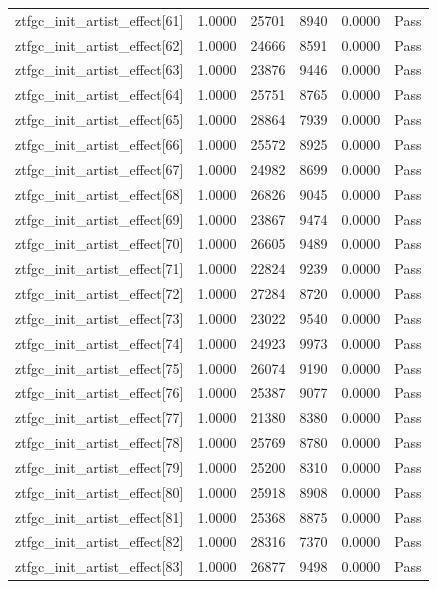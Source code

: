 \begin{table}[htbp]
\begin{tabular}{llrrll}
ztfgc\_init\_artist\_effect[61] & 1.0000 & 25701 & 8940 & 0.0000 & Pass \\
ztfgc\_init\_artist\_effect[62] & 1.0000 & 24666 & 8591 & 0.0000 & Pass \\
ztfgc\_init\_artist\_effect[63] & 1.0000 & 23876 & 9446 & 0.0000 & Pass \\
ztfgc\_init\_artist\_effect[64] & 1.0000 & 25751 & 8765 & 0.0000 & Pass \\
ztfgc\_init\_artist\_effect[65] & 1.0000 & 28864 & 7939 & 0.0000 & Pass \\
ztfgc\_init\_artist\_effect[66] & 1.0000 & 25572 & 8925 & 0.0000 & Pass \\
ztfgc\_init\_artist\_effect[67] & 1.0000 & 24982 & 8699 & 0.0000 & Pass \\
ztfgc\_init\_artist\_effect[68] & 1.0000 & 26826 & 9045 & 0.0000 & Pass \\
ztfgc\_init\_artist\_effect[69] & 1.0000 & 23867 & 9474 & 0.0000 & Pass \\
ztfgc\_init\_artist\_effect[70] & 1.0000 & 26605 & 9489 & 0.0000 & Pass \\
ztfgc\_init\_artist\_effect[71] & 1.0000 & 22824 & 9239 & 0.0000 & Pass \\
ztfgc\_init\_artist\_effect[72] & 1.0000 & 27284 & 8720 & 0.0000 & Pass \\
ztfgc\_init\_artist\_effect[73] & 1.0000 & 23022 & 9540 & 0.0000 & Pass \\
ztfgc\_init\_artist\_effect[74] & 1.0000 & 24923 & 9973 & 0.0000 & Pass \\
ztfgc\_init\_artist\_effect[75] & 1.0000 & 26074 & 9190 & 0.0000 & Pass \\
ztfgc\_init\_artist\_effect[76] & 1.0000 & 25387 & 9077 & 0.0000 & Pass \\
ztfgc\_init\_artist\_effect[77] & 1.0000 & 21380 & 8380 & 0.0000 & Pass \\
ztfgc\_init\_artist\_effect[78] & 1.0000 & 25769 & 8780 & 0.0000 & Pass \\
ztfgc\_init\_artist\_effect[79] & 1.0000 & 25200 & 8310 & 0.0000 & Pass \\
ztfgc\_init\_artist\_effect[80] & 1.0000 & 25918 & 8908 & 0.0000 & Pass \\
ztfgc\_init\_artist\_effect[81] & 1.0000 & 25368 & 8875 & 0.0000 & Pass \\
ztfgc\_init\_artist\_effect[82] & 1.0000 & 28316 & 7370 & 0.0000 & Pass \\
ztfgc\_init\_artist\_effect[83] & 1.0000 & 26877 & 9498 & 0.0000 & Pass \\

\end{tabular}
\end{table}
